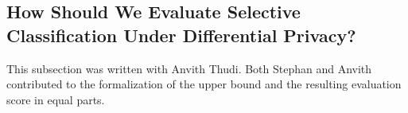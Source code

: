 


\subsection{How Should We Evaluate Selective Classification Under Differential Privacy?}
\label{sec:new_metric}

\begin{contriback}
This subsection was written with Anvith Thudi. Both Stephan and Anvith contributed to the formalization of the upper bound and the resulting evaluation score in equal parts.
\end{contriback}




